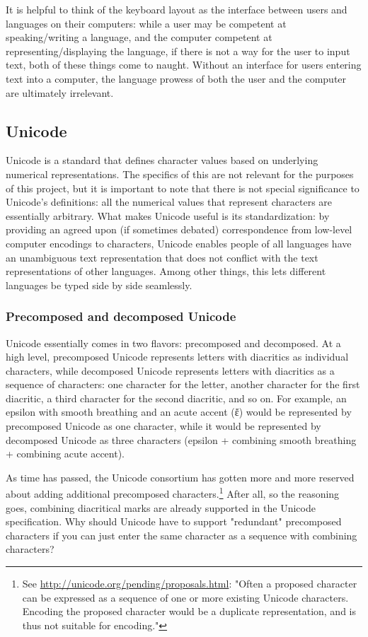 \documentclass[11pt]{article}
\begin{document}
It is helpful to think of the keyboard layout as the interface between users and languages on their computers: while a user may be competent at speaking/writing a language, and the computer competent at representing/displaying the language, if there is not a way for the user to input text, both of these things come to naught. Without an interface for users entering text into a computer, the language prowess of both the user and the computer are ultimately irrelevant.

\subsection{Unicode}
\label{sec:org860216d}

Unicode is a standard that defines character values based on underlying numerical representations. The specifics of this are not relevant for the purposes of this project, but it is important to note that there is not special significance to Unicode's definitions: all the numerical values that represent characters are essentially arbitrary. What makes Unicode useful is its standardization: by providing an agreed upon (if sometimes debated) correspondence from low-level computer encodings to characters, Unicode enables people of all languages have an unambiguous text representation that does not conflict with the text representations of other languages. Among other things, this lets different languages be typed side by side seamlessly.

\subsubsection{Precomposed and decomposed Unicode}
\label{sec:org91eed39}

Unicode essentially comes in two flavors: precomposed and decomposed. At a high level, precomposed Unicode represents letters with diacritics as individual characters, while decomposed Unicode represents letters with diacritics as a sequence of characters: one character for the letter, another character for the first diacritic, a third character for the second diacritic, and so on. For example, an epsilon with smooth breathing and an acute accent (ἔ) would be represented by precomposed Unicode as one character, while it would be represented by decomposed Unicode as three characters (epsilon + combining smooth breathing + combining acute accent).

As time has passed, the Unicode consortium has gotten more and more reserved about adding additional precomposed characters.\footnote{See \url{http://unicode.org/pending/proposals.html}: "Often a proposed character can be expressed as a sequence of one or more existing Unicode characters. Encoding the proposed character would be a duplicate representation, and is thus not suitable for encoding."} After all, so the reasoning goes, combining diacritical marks are already supported in the Unicode specification. Why should Unicode have to support "redundant" precomposed characters if you can just enter the same character as a sequence with combining characters?
\end{document}
